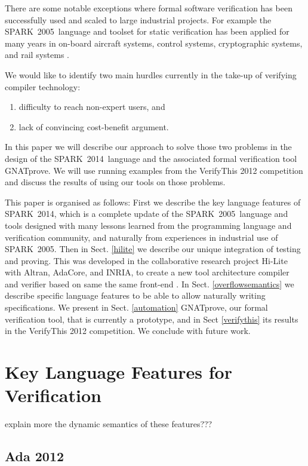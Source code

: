 \documentclass[sttt,draft]{svjour}
\newcommand{\hilite}{Hi-Lite}
\newcommand{\gnatprove}{GNATprove\xspace}
\newcommand{\oldspark}{SPARK~2005\xspace}
\newcommand{\newspark}{SPARK~2014\xspace}
\begin{document}
There are some notable exceptions where formal software verification
has been successfully used and scaled to large industrial projects. For
example the \oldspark\ language and toolset for static verification
has been applied for many years in on-board aircraft systems, control
systems, cryptographic systems, and rail systems
\cite{sparkbook2012,oneill2012}.

We would like to identify two main hurdles currently in the take-up of
verifying compiler technology:
%
\begin{enumerate}
\item difficulty to reach non-expert users, and
\item lack of convincing cost-benefit argument.
\end{enumerate}
%
In this paper we will describe our approach to solve those two
problems in the design of the \newspark\ language and the associated
formal verification tool \gnatprove. We will use running examples from
the VerifyThis 2012 competition and discuss the results of using our
tools on those problems.

This paper is organised as follows: First we describe the key language
features of \newspark, which is a complete update of the
\oldspark\ language and tools designed with many lessons learned from
the programming language and verification community, and naturally
from experiences in industrial use of \oldspark. Then in
Sect. \ref{hilite} we describe our unique integration of testing and
proving. This was developed in the collaborative research project
\hilite\ \cite{hiliteERTS2012} with Altran, AdaCore, and INRIA, to
create a new tool architecture compiler and verifier based on same the
same front-end \cite{ksd2012}. In Sect. \ref{overflowsemantics} we
describe specific language features to be able to allow naturally
writing specifications. We present in Sect. \ref{automation}
GNATprove, our formal verification tool, that is currently a
prototype, and in Sect \ref{verifythis} its results in the VerifyThis
2012 competition. We conclude with future work.

\section{Key Language Features for Verification}
\label{langfeatures}

explain more the dynamic semantics of these features???

\subsection{Ada 2012}
\end{document}
